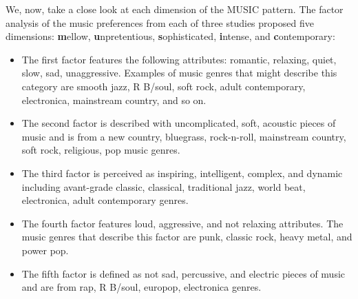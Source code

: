 We, now, take a close look at each dimension of the MUSIC pattern.
The factor analysis of the music preferences from each of three studies proposed five dimensions:
\textbf{m}ellow, \textbf{u}npretentious, \textbf{s}ophisticated, \textbf{i}ntense, and \textbf{c}ontemporary:
\begin{itemize}
    \item The first factor features the following attributes: romantic, relaxing, quiet, slow, sad, unaggressive.
    Examples of music genres that might describe this category are smooth jazz, R B/soul, soft rock,
    adult contemporary, electronica, mainstream country, and so on.
    \item The second factor is described with uncomplicated, soft, acoustic pieces of music and is from a new country,
    bluegrass, rock-n-roll, mainstream country, soft rock, religious, pop music genres.
    \item The third factor is perceived as inspiring, intelligent, complex, and dynamic including
    avant-grade classic, classical, traditional jazz, world beat, electronica, adult contemporary genres.
    \item The fourth factor features loud, aggressive, and not relaxing attributes.
    The music genres that describe this factor are punk, classic rock, heavy metal, and power pop.
    \item The fifth factor is defined as not sad, percussive, and electric pieces of
    music and are from rap, R B/soul, europop, electronica genres.
\end{itemize}

